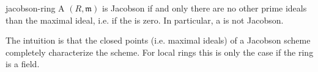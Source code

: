 \begin{example}{jacobson-ring}
    A  $(R, \mathfrak{m})$ is Jacobson if and only there are no other prime ideals than the maximal ideal, i.e. if the  is zero. In particular, a  is not Jacobson.
    
    The intuition is that the closed points (i.e. maximal ideals) of a Jacobson scheme completely characterize the scheme. For local rings this is only the case if the ring is a field.
\end{example}

